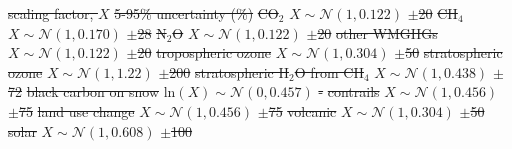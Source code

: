 \documentclass[gmd, manuscript]{copernicus}
\providecommand{\DIFdel}[1]{{\protect\color{red}\sout{#1}}}                      %
\begin{document}
\DIFdel{scaling factor, $X$ }%
\DIFdel{5-95\% uncertainty (\%)}%
\DIFdel{CO$_2$ }%
\DIFdel{$X\sim\mathcal{N}\left(1,0.122\right)$ }%
\DIFdel{$\pm$20 }%
\DIFdel{CH$_4$ }%
\DIFdel{$X\sim\mathcal{N}\left(1,0.170\right)$ }%
\DIFdel{$\pm$28 }%
\DIFdel{N$_2$O }%
\DIFdel{$X\sim\mathcal{N}\left(1,0.122\right)$ }%
\DIFdel{$\pm$20 }%
\DIFdel{other WMGHGs }%
\DIFdel{$X\sim\mathcal{N}\left(1,0.122\right)$ }%
\DIFdel{$\pm$20 }%
\DIFdel{tropospheric ozone }%
\DIFdel{$X\sim\mathcal{N}\left(1,0.304\right)$ }%
\DIFdel{$\pm$50 }%
\DIFdel{stratospheric ozone }%
\DIFdel{$X\sim\mathcal{N}\left(1,1.22\right)$ }%
\DIFdel{$\pm$200 }%
\DIFdel{stratospheric H$_2$O from CH$_4$ }%
\DIFdel{$X\sim\mathcal{N}\left(1,0.438\right)$ }%
\DIFdel{$\pm$72 }%
\DIFdel{black carbon on snow }%
\DIFdel{$\mathrm{ln}(X)\sim\mathcal{N}\left(0,0.457\right)$ }%
\DIFdel{- }%
\DIFdel{contrails }%
\DIFdel{$X\sim\mathcal{N}\left(1,0.456\right)$ }%
\DIFdel{$\pm$75 }%
\DIFdel{land use change }%
\DIFdel{$X\sim\mathcal{N}\left(1,0.456\right)$ }%
\DIFdel{$\pm$75 }%
\DIFdel{volcanic }%
\DIFdel{$X\sim\mathcal{N}\left(1,0.304\right)$ }%
\DIFdel{$\pm$50 }%
\DIFdel{solar }%
\DIFdel{$X\sim\mathcal{N}\left(1,0.608\right)$ }%
\DIFdel{$\pm$100 }%
\end{document}
